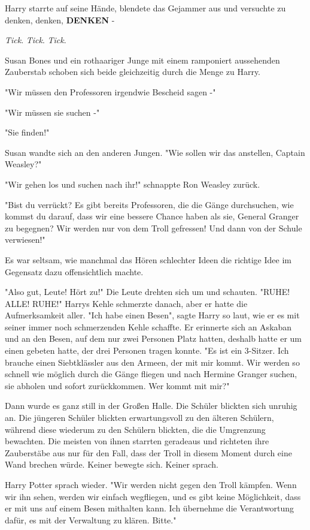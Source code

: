 {Harry starrte auf seine Hände, blendete das Gejammer aus und versuchte zu denken, denken, \textbf{DENKEN} -

\emph{Tick}. \emph{Tick}. \emph{Tick}.

Susan Bones und ein rothaariger Junge mit einem ramponiert aussehenden Zauberstab schoben sich beide gleichzeitig durch die Menge zu Harry.

"Wir müssen den Professoren irgendwie Bescheid sagen -"

"Wir müssen sie suchen -"

"Sie finden!"

Susan wandte sich an den anderen Jungen. "Wie sollen wir das anstellen, Captain Weasley?"

"Wir gehen los und suchen nach ihr!" schnappte Ron Weasley zurück.

"Bist du verrückt? Es gibt bereits Professoren, die die Gänge durchsuchen, wie kommst du darauf, dass wir eine bessere Chance haben als sie, General Granger zu begegnen? Wir werden nur von dem Troll gefressen! Und dann von der Schule verwiesen!"

Es war seltsam, wie manchmal das Hören schlechter Ideen die richtige Idee im Gegensatz dazu offensichtlich machte.

"Also gut, Leute! Hört zu!" Die Leute drehten sich um und schauten. "RUHE! ALLE! RUHE!" Harrys Kehle schmerzte danach, aber er hatte die Aufmerksamkeit aller. "Ich habe einen Besen", sagte Harry so laut, wie er es mit seiner immer noch schmerzenden Kehle schaffte. Er erinnerte sich an Askaban und an den Besen, auf dem nur zwei Personen Platz hatten, deshalb hatte er um einen gebeten hatte, der drei Personen tragen konnte. "Es ist ein 3-Sitzer. Ich brauche einen Siebtklässler aus den Armeen, der mit mir kommt. Wir werden so schnell wie möglich durch die Gänge fliegen und nach Hermine Granger suchen, sie abholen und sofort zurückkommen. Wer kommt mit mir?"

Dann wurde es ganz still in der Großen Halle. Die Schüler blickten sich unruhig an. Die jüngeren Schüler blickten erwartungsvoll zu den älteren Schülern, während diese wiederum zu den Schülern blickten, die die Umgrenzung bewachten. Die meisten von ihnen starrten geradeaus und richteten ihre Zauberstäbe aus nur für den Fall, dass der Troll in diesem Moment durch eine Wand brechen würde. Keiner bewegte sich. Keiner sprach.

Harry Potter sprach wieder. "Wir werden nicht gegen den Troll kämpfen. Wenn wir ihn sehen, werden wir einfach wegfliegen, und es gibt keine Möglichkeit, dass er mit uns auf einem Besen mithalten kann. Ich übernehme die Verantwortung dafür, es mit der Verwaltung zu klären. Bitte."

}
